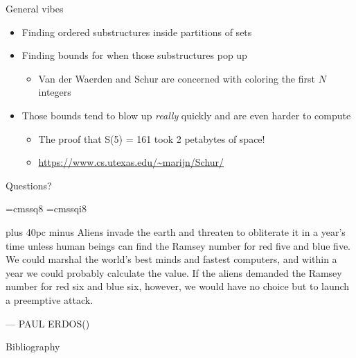 \documentclass[aspectratio=169]{beamer}
\begin{document}
\begin{frame}{General vibes}
    \begin{itemize}
        \item Finding ordered substructures inside partitions of sets \pause
        \item Finding bounds for when those substructures pop up
        \begin{itemize} %
            \item Van der Waerden and Schur are concerned with coloring the first $N$ integers
        \end{itemize} \pause 
        \item Those bounds tend to blow up \textit{really} quickly and are even harder to compute \pause
        \begin{itemize}
            \item The proof that S(5) = 161 took 2 petabytes of space!
            \item \url{https://www.cs.utexas.edu/~marijn/Schur/}
        \end{itemize}
    \end{itemize}
\end{frame}

\begin{frame}{}
      \begin{center}
    {\color{sigma@mainblue} \LARGE Questions?}
  \end{center}
\end{frame}

\font\eightss=cmssq8
\font\eightssi=cmssqi8
\newcommand\quoteAuthorDate[3]{\begingroup
  \baselineskip 10pt
  \parfillskip 0pt
  \interlinepenalty 10000 %
  \leftskip 0pt plus 40pc minus \parindent
  \let\rm=\eightss
  \let\sl=\eightssi
  \everypar{\sl}#1\par
  \nobreak\smallskip
  \noindent\rm--- #2\unskip\enspace(#3)\par
  \endgroup}
\begin{frame}
    \begin{center}
        \item \quoteAuthorDate{Aliens invade the earth and threaten to obliterate it in a year’s time unless human beings can find the Ramsey number for red five and blue five. We could marshal the world’s best minds and fastest computers, and within a year we could probably calculate the value. If the aliens demanded the Ramsey number for red six and blue six, however, we would have no choice but to launch a preemptive attack.}{PAUL ERDOS}{\cite{Graham}}
    \end{center}
\end{frame}

\begin{frame}{Bibliography}
    
    
\end{frame}
\end{document}

